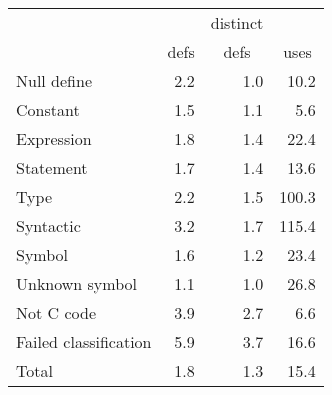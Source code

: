 \begin{tabular}{|l|r|r|r|} \hline
 & & \multicolumn{1}{c|}{distinct} & \\
 & \multicolumn{1}{c|}{defs} & \multicolumn{1}{c|}{defs} & \multicolumn{1}{c|}{uses} \\ \hline
Null define & 2.2 & 1.0 & 10.2 \\
Constant & 1.5 & 1.1 & 5.6 \\
Expression & 1.8 & 1.4 & 22.4 \\
Statement & 1.7 & 1.4 & 13.6 \\
Type & 2.2 & 1.5 & 100.3 \\
Syntactic & 3.2 & 1.7 & 115.4 \\
Symbol & 1.6 & 1.2 & 23.4 \\
Unknown symbol & 1.1 & 1.0 & 26.8 \\
Not C code & 3.9 & 2.7 & 6.6 \\
Failed classification & 5.9 & 3.7 & 16.6 \\ \hline
Total & 1.8 & 1.3 & 15.4 \\ \hline
\end{tabular}

